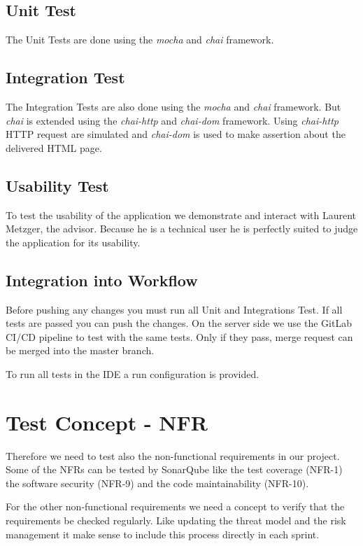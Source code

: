 \subsection{Unit Test}
The Unit Tests are done using the \textit{mocha} and \textit{chai} framework.

\subsection{Integration Test}
The Integration Tests are also done using the \textit{mocha} and \textit{chai} framework.
But \textit{chai} is extended using the \textit{chai-http} and \textit{chai-dom} framework.
Using \textit{chai-http} HTTP request are simulated and \textit{chai-dom} is used to make assertion about the delivered HTML page.

\subsection{Usability Test}
To test the usability of the application we demonstrate and interact with Laurent Metzger, the advisor.
Because he is a technical user he is perfectly suited to judge the application for its usability.

\subsection{Integration into Workflow}
Before pushing any changes you must run all Unit and Integrations Test.
If all tests are passed you can push the changes.
On the server side we use the GitLab CI/CD pipeline to test with the same tests.
Only if they pass, merge request can be merged into the master branch.

To run all tests in the IDE a run configuration is provided.


\section{Test Concept - NFR}
Therefore we need to test also the non-functional requirements in our project. Some of the NFRs can be tested by SonarQube like the test coverage (NFR-1) the software security (NFR-9) and the code maintainability (NFR-10).

For the other non-functional requirements we need a concept to verify that the requirements be checked regularly. Like updating the threat model and the risk management it make sense to include this process directly in each sprint.

